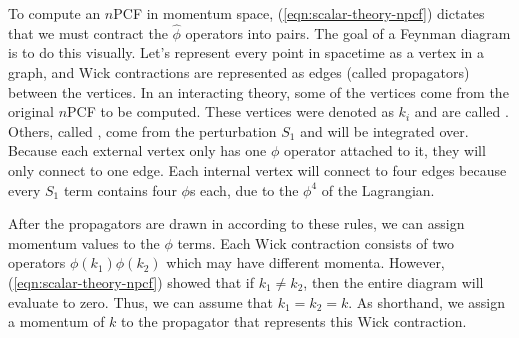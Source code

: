 To compute an $n$PCF in momentum space, (\ref{eqn:scalar-theory-npcf}) dictates that we must contract the $\hat \phi$ operators into pairs. The goal of a Feynman diagram is to do this visually. Let's represent every point in spacetime as a vertex in a graph, and Wick contractions are represented as edges (called propagators) between the vertices. In an interacting theory, some of the vertices come from the original $n$PCF to be computed. These vertices were denoted as $k_i$ and are called . Others, called , come from the perturbation $S_1$ and will be integrated over. Because each external vertex only has one $\phi$ operator attached to it, they will only connect to one edge. Each internal vertex will connect to four edges because every $S_1$ term contains four $\phi$s each, due to the $\phi^4$ of the Lagrangian.

After the propagators are drawn in according to these rules, we can assign momentum values to the $\phi$ terms. Each Wick contraction consists of two operators $\phi(k_1)\phi(k_2)$ which may have different momenta. However, (\ref{eqn:scalar-theory-npcf}) showed that if $k_1 \neq k_2$, then the entire diagram will evaluate to zero. Thus, we can assume that $k_1 = k_2 = k$. As shorthand, we assign a momentum of $k$ to the propagator that represents this Wick contraction.





